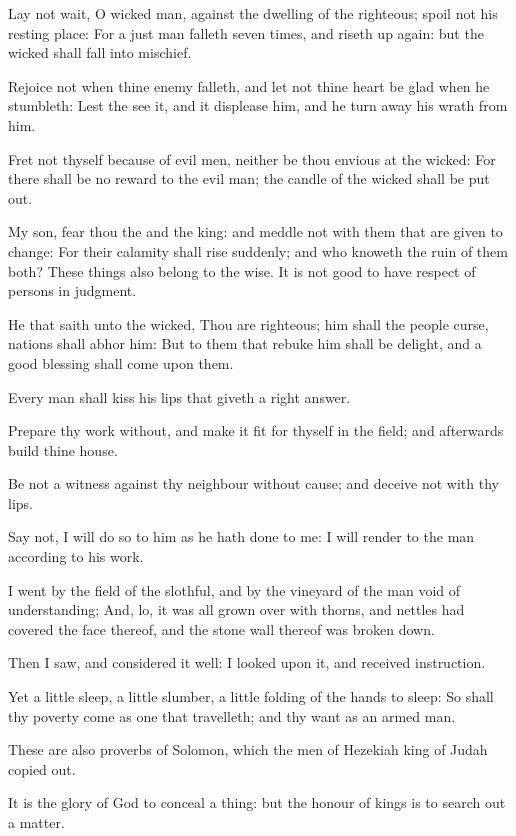 \Verse Lay not wait, O wicked man, against the dwelling of the righteous; spoil not his resting place: \Verse For a just man falleth seven times, and riseth up again: but the wicked shall fall into mischief.

\Verse Rejoice not when thine enemy falleth, and let not thine heart be glad when he stumbleth: \Verse Lest the \LORD see it, and it displease him, and he turn away his wrath from him.

\Verse Fret not thyself because of evil men, neither be thou envious at the wicked: \Verse For there shall be no reward to the evil man; the candle of the wicked shall be put out.

\Verse My son, fear thou the \LORD and the king: and meddle not with them that are given to change: \Verse For their calamity shall rise suddenly; and who knoweth the ruin of them both?  \Verse These things also belong to the wise. It is not good to have respect of persons in judgment.

\Verse He that saith unto the wicked, Thou are righteous; him shall the people curse, nations shall abhor him: \Verse But to them that rebuke him shall be delight, and a good blessing shall come upon them.

\Verse Every man shall kiss his lips that giveth a right answer.

\Verse Prepare thy work without, and make it fit for thyself in the field; and afterwards build thine house.

\Verse Be not a witness against thy neighbour without cause; and deceive not with thy lips.

\Verse Say not, I will do so to him as he hath done to me: I will render to the man according to his work.

\Verse I went by the field of the slothful, and by the vineyard of the man void of understanding; \Verse And, lo, it was all grown over with thorns, and nettles had covered the face thereof, and the stone wall thereof was broken down.

\Verse Then I saw, and considered it well: I looked upon it, and received instruction.

\Verse Yet a little sleep, a little slumber, a little folding of the hands to sleep: \Verse So shall thy poverty come as one that travelleth; and thy want as an armed man.


\Chapter
\Verse These are also proverbs of Solomon, which the men of Hezekiah king of Judah copied out.

\Verse It is the glory of God to conceal a thing: but the honour of kings is to search out a matter.

